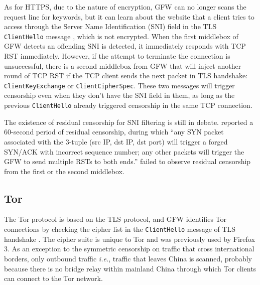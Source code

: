 \documentclass[sigconf, screen, balance=false]{acmart}
\begin{document}
As for HTTPS, due to the nature of encryption, GFW can no longer scans the request line for keywords, but it can learn about the website that a client tries to access through the Server Name Identification (SNI) field in the TLS \texttt{ClientHello} message \cite{ChaiGH19}, which is not encrypted. When the first middlebox of GFW detects an offending SNI is detected, it immediately responds with TCP RST immediately. However, if the attempt to terminate the connection is unsuccessful, there is a second middlebox from GFW that will inject another round of TCP RST if the TCP client sends the next packet in TLS handshake: \texttt{ClientKeyExchange} or \texttt{ClientCipherSpec}. \cite{bock2021even} These two messages will trigger censorship even when they don't have the SNI field in them, as long as the previous \texttt{ClientHello} already triggered censorship in the same TCP connection.

The existence of residual censorship for SNI filtering is still in debate. \citeauthor{ChaiGH19} reported a 60-second period of residual censorship, during which ``any SYN packet associated with the 3-tuple (src IP, dst IP, dst port) will trigger a forged SYN/ACK with incorrect sequence number; any other packets will trigger the GFW to send multiple RSTs to both ends.'' \citeauthor{bock2021even} failed to observe residual censorship from the first or the second middlebox.

\subsection{Tor}

The Tor protocol is based on the TLS protocol, and GFW identifies Tor connections by checking the cipher list in the \texttt{ClientHello} message of TLS handshake \cite{wilde2012great}. The cipher suite is unique to Tor and was previously used by Firefox 3. \cite{winter2012how} As an exception to the symmetric censorship on traffic that cross international borders, only outbound traffic \textit{i.e.}, traffic that leaves China is scanned, probably because there is no bridge relay within mainland China through which Tor clients can connect to the Tor network.
\end{document}
